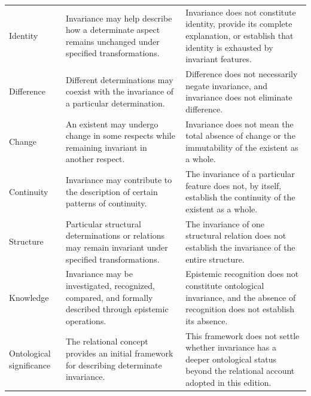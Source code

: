 \begin{longtable}{
    @{}
    >{\raggedright\arraybackslash}p{}
    >{\raggedright\arraybackslash}p{}
    >{\raggedright\arraybackslash}p{}
    @{}
}
\addlinespace[0.5em]

Identity &
Invariance may help describe how a determinate
aspect remains unchanged under specified
transformations. &
Invariance does not constitute identity, provide
its complete explanation, or establish that
identity is exhausted by invariant features.
\\

\addlinespace[0.5em]

Difference &
Different determinations may coexist with
the invariance of a particular determination. &
Difference does not necessarily negate invariance,
and invariance does not eliminate difference.
\\

\addlinespace[0.5em]

Change &
An existent may undergo change in some respects
while remaining invariant in another respect. &
Invariance does not mean the total absence
of change or the immutability of the existent
as a whole.
\\

\addlinespace[0.5em]

Continuity &
Invariance may contribute to the description
of certain patterns of continuity. &
The invariance of a particular feature does not,
by itself, establish the continuity of the existent
as a whole.
\\

\addlinespace[0.5em]

Structure &
Particular structural determinations or relations
may remain invariant under specified
transformations. &
The invariance of one structural relation does not
establish the invariance of the entire structure.
\\

\addlinespace[0.5em]

Knowledge &
Invariance may be investigated, recognized,
compared, and formally described through
epistemic operations. &
Epistemic recognition does not constitute
ontological invariance, and the absence
of recognition does not establish its absence.
\\

\addlinespace[0.5em]

Ontological significance &
The relational concept provides an initial
framework for describing determinate invariance. &
This framework does not settle whether invariance
has a deeper ontological status beyond the
relational account adopted in this edition.
\\

\end{longtable}

\endgroup

